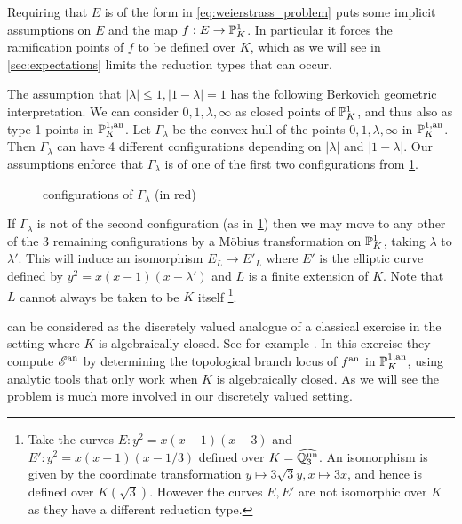 Requiring that $E$ is of the form in \eqref{eq:weierstrass_problem} puts some implicit assumptions on $E$ and the map $f: E \to \mathbb{P}^{1}_K$.
In particular it forces the ramification points of $f$ to be defined over $K$, which as we will see in \cref{sec:expectations} limits the reduction types that can occur. 

The assumption that $|\lambda| \le 1, |1 - \lambda| = 1$ has the following Berkovich geometric interpretation.
We can consider $0, 1, \lambda, \infty$ as closed points of $\mathbb{P}^{1}_K$, and thus also as type 1 points in $\mathbb{P}^{1, \text{an}}_K$.
Let  $\Gamma_\lambda$ be the convex hull of the points $0, 1, \lambda, \infty$ in $\mathbb{P}^{1, \text{an}}_K$. 
Then  $\Gamma_\lambda$ can have 4 different configurations depending on $|\lambda|$ and $|1-\lambda|$. 
Our assumptions enforce that $\Gamma_\lambda$ is of one of the first two configurations from \cref{fig:configurations_of_gamma_lambda}.
\begin{figure}[ht]
    \centering
    \caption{configurations of $\Gamma_\lambda$ (in red)}
    \label{fig:configurations_of_gamma_lambda}
\end{figure}
If  $\Gamma_\lambda$ is not of the second configuration (as in \cref{fig:configurations_of_gamma_lambda}) then we may move to any other of the 3 remaining configurations by a Möbius transformation on $\mathbb{P}^{1}_K$, taking $\lambda$ to $\lambda'$. 
This will induce an isomorphism $E_L \to E'_L$ where $E'$ is the elliptic curve defined by $y^2 = x(x-1)(x-\lambda')$ and $L$ is a finite extension of $K$. 
Note  that $L$ cannot always be taken to be $K$ itself
\footnote{Take the curves $E: y^2 = x(x -1)(x-3)$ and $E': y^2 = x(x-1)(x-1 /3)$ defined over $K = \widehat{\mathbb{Q}_3^{\text{un}}}$.
An isomorphism is given by the coordinate transformation $y\mapsto 3\sqrt{3} y, x\mapsto 3x$, and hence is defined over $K(\sqrt{3} )$. However the curves $E, E'$ are not isomorphic over $K$ as they have a different reduction type.}.

\begin{remark}
	 can be considered as the discretely valued analogue of a classical exercise in the setting where $K$ is algebraically closed.
	See for example \cite[exericise 6.1.3.3]{temkinIntroductionBerkovichAnalytic2010}.  
	In this exercise they compute $\mathscr E{}^{\text{an}}$ by determining the topological branch locus of $f{}^{\text{an}}$ in $\mathbb{P}^{1, \text{an}}_K$, using analytic tools that only work when $K$ is algebraically closed. 
	As we will see the problem is much more involved in our discretely valued setting. 
\end{remark}










